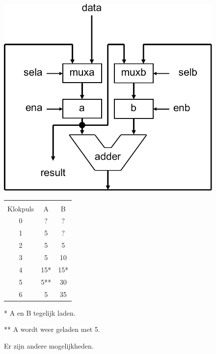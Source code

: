 \documentclass[a4paper,12pt,fleqn,dutch,mimicwordtwentyten]{tisdexam}
\begin{document}
\begin{questions}
\begin{figure}[H]
  \begin{minipage}[!t]{0.60\linewidth}
    \centering
	\includegraphics[scale=0.55]{pINLMIC_eenvoudige_rekenaar.pdf}
  \end{minipage}\hfill
  \begin{minipage}[!t]{.350\linewidth}
    \begin{tabular}{ c | c c }
      \hline
                &       &               \\ [-2.9ex]
       Klokpuls &  A    &  B     \\ \hline
           0    &  ?    &  ?     \\
           1    &  5    &  ?     \\
           2    &  5    &  5     \\
           3    &  5    &  10    \\
           4    &  15*  &  15*   \\
           5    &  5**  &  30    \\
           6    &  5    &  35    \\ \hline
    \end{tabular}
    
    * A en B tegelijk laden.
    
    ** A wordt weer geladen met 5.
    
    Er zijn andere mogelijkheden.
    \vskip10pt
  \end{minipage}\hfill
\end{figure}


\end{questions}
\end{document}
